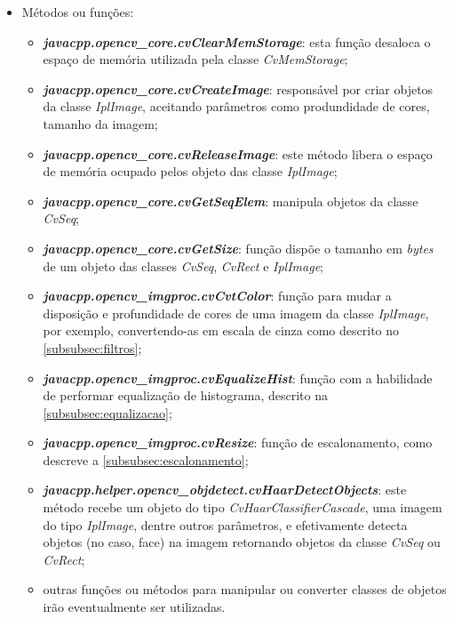 \begin{itemize}
	\item Métodos ou funções:
	\begin{itemize}		
		\item \textbf{\textit{javacpp.opencv\_core.cvClearMemStorage}}: esta função desaloca o espaço de memória utilizada pela classe \textit{CvMemStorage};
		
		\item \textbf{\textit{javacpp.opencv\_core.cvCreateImage}}: responsável por criar objetos da classe \textit{IplImage}, aceitando parâmetros como produndidade de cores, tamanho da imagem;
		
		\item \textbf{\textit{javacpp.opencv\_core.cvReleaseImage}}: este método libera o espaço de memória ocupado pelos objeto das classe \textit{IplImage};

		\item \textbf{\textit{javacpp.opencv\_core.cvGetSeqElem}}: manipula objetos da classe \textit{CvSeq};
		
		\item \textbf{\textit{javacpp.opencv\_core.cvGetSize}}: função dispõe o tamanho em \textit{bytes} de um objeto das classes \textit{CvSeq}, \textit{CvRect} e \textit{IplImage};		
		
		\item \textbf{\textit{javacpp.opencv\_imgproc.cvCvtColor}}: função para mudar a disposição e profundidade de cores de uma imagem da classe \textit{IplImage}, por exemplo, convertendo-as em escala de cinza como descrito no \autoref{subsubsec:filtros};
		
		\item \textbf{\textit{javacpp.opencv\_imgproc.cvEqualizeHist}}: função com a habilidade de performar equalização de histograma, descrito na \autoref{subsubsec:equalizacao};
		
		\item \textbf{\textit{javacpp.opencv\_imgproc.cvResize}}: função de escalonamento, como descreve a \autoref{subsubsec:escalonamento};

		\item \textbf{\textit{javacpp.helper.opencv\_objdetect.cvHaarDetectObjects}}: este método recebe um objeto do tipo \textit{CvHaarClassifierCascade}, uma imagem do tipo \textit{IplImage}, dentre outros parâmetros, e efetivamente detecta objetos (no caso, face) na imagem retornando objetos da classe \textit{CvSeq} ou \textit{CvRect};
		
		\item outras funções ou métodos para manipular ou converter classes de objetos irão eventualmente ser utilizadas.
	\end{itemize}	
\end{itemize}

